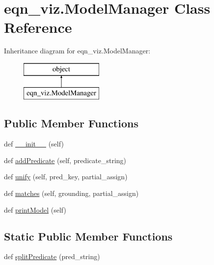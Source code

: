 \hypertarget{classeqn__viz_1_1_model_manager}{}\section{eqn\+\_\+viz.\+Model\+Manager Class Reference}
\label{classeqn__viz_1_1_model_manager}
Inheritance diagram for eqn\+\_\+viz.\+Model\+Manager\+:\begin{figure}[H]
\begin{center}
\leavevmode
\includegraphics[height=2.000000cm]{classeqn__viz_1_1_model_manager}
\end{center}
\end{figure}
\subsection*{Public Member Functions}
\begin{DoxyCompactItemize}
\item 
def \hyperlink{classeqn__viz_1_1_model_manager_af6ba57e4dc5a80892675666f43c684f0}{\+\_\+\+\_\+init\+\_\+\+\_\+} (self)
\item 
def \hyperlink{classeqn__viz_1_1_model_manager_ac48c7611f5a1fe95415e0651e25a178c}{add\+Predicate} (self, predicate\+\_\+string)
\item 
def \hyperlink{classeqn__viz_1_1_model_manager_ab8c6e9a67b3c5d03195a51b252279803}{unify} (self, pred\+\_\+key, partial\+\_\+assign)
\item 
def \hyperlink{classeqn__viz_1_1_model_manager_af8a8903380fb509db8188c7ad91e3d3c}{matches} (self, grounding, partial\+\_\+assign)
\item 
def \hyperlink{classeqn__viz_1_1_model_manager_a8cdf7c43e933d043dd25cd2fd76b4836}{print\+Model} (self)
\end{DoxyCompactItemize}
\subsection*{Static Public Member Functions}
\begin{DoxyCompactItemize}
\item 
def \hyperlink{classeqn__viz_1_1_model_manager_a01de2c06921a956c3ccf1f64e3fc1c77}{split\+Predicate} (pred\+\_\+string)
\end{DoxyCompactItemize}
